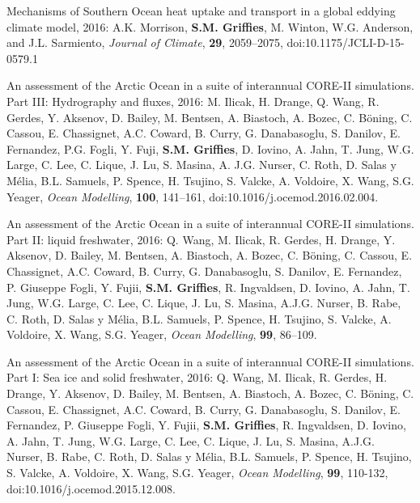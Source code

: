 \begin{etaremune}
\item Mechanisms of Southern Ocean heat uptake and transport in a
  global eddying climate model, 2016: A.K. Morrison, {\bf
    S.M. Grif\/f\/ies}, M. Winton, W.G. Anderson, and J.L. Sarmiento,
  {\it Journal of Climate}, {\bf 29}, 2059--2075,
  doi:10.1175/JCLI-D-15-0579.1

\item An assessment of the Arctic Ocean in a suite of interannual
  CORE-II simulations. Part III: Hydrography and fluxes, 2016:
  M. Ilicak, H. Drange, Q. Wang, R. Gerdes, Y. Aksenov, D. Bailey,
  M. Bentsen, A. Biastoch, A. Bozec, C. B\"{o}ning, C. Cassou,
  E. Chassignet, A.C. Coward, B. Curry, G. Danabasoglu, S. Danilov,
  E. Fernandez, P.G. Fogli, Y. Fuji, {\bf S.M. Grif\/f\/ies},
  D. Iovino, A. Jahn, T. Jung, W.G. Large, C. Lee, C. Lique, J. Lu,
  S. Masina, A. J.G. Nurser, C. Roth, D. Salas y M\'{e}lia,
  B.L. Samuels, P. Spence, H. Tsujino, S. Valcke, A. Voldoire,
  X. Wang, S.G. Yeager, {\it Ocean Modelling}, {\bf 100}, 141--161,
  doi:10.1016/j.ocemod.2016.02.004.

\item An assessment of the Arctic Ocean in a suite of interannual
  CORE-II simulations. Part II: liquid freshwater, 2016: Q. Wang,
  M. Ilicak, R. Gerdes, H. Drange, Y. Aksenov, D. Bailey, M. Bentsen,
  A. Biastoch, A. Bozec, C. B\"{o}ning, C.  Cassou, E. Chassignet,
  A.C. Coward, B. Curry, G. Danabasoglu, S. Danilov, E. Fernandez,
  P. Giuseppe Fogli, Y. Fujii, {\bf S.M. Grif\/f\/ies}, R. Ingvaldsen,
  D. Iovino, A. Jahn, T. Jung, W.G. Large, C. Lee, C. Lique, J. Lu,
  S. Masina, A.J.G. Nurser, B. Rabe, C. Roth, D. Salas y M\'elia,
  B.L. Samuels, P. Spence, H. Tsujino, S. Valcke, A. Voldoire,
  X. Wang, S.G. Yeager, {\it Ocean Modelling}, {\bf 99}, 86--109.

\item An assessment of the Arctic Ocean in a suite of interannual
  CORE-II simulations. Part I: Sea ice and solid freshwater, 2016:
  Q. Wang, M. Ilicak, R. Gerdes, H. Drange, Y. Aksenov, D. Bailey,
  M. Bentsen, A. Biastoch, A. Bozec, C. B\"{o}ning, C.  Cassou,
  E. Chassignet, A.C. Coward, B. Curry, G. Danabasoglu, S. Danilov,
  E. Fernandez, P. Giuseppe Fogli, Y. Fujii, {\bf S.M. Grif\/f\/ies},
  R. Ingvaldsen, D. Iovino, A. Jahn, T. Jung, W.G. Large, C. Lee,
  C. Lique, J. Lu, S. Masina, A.J.G. Nurser, B. Rabe, C. Roth,
  D. Salas y M\'elia, B.L. Samuels, P. Spence, H. Tsujino, S. Valcke,
  A. Voldoire, X. Wang, S.G. Yeager, {\it Ocean Modelling}, {\bf 99},
  110-132, doi:10.1016/j.ocemod.2015.12.008.


\end{etaremune}
